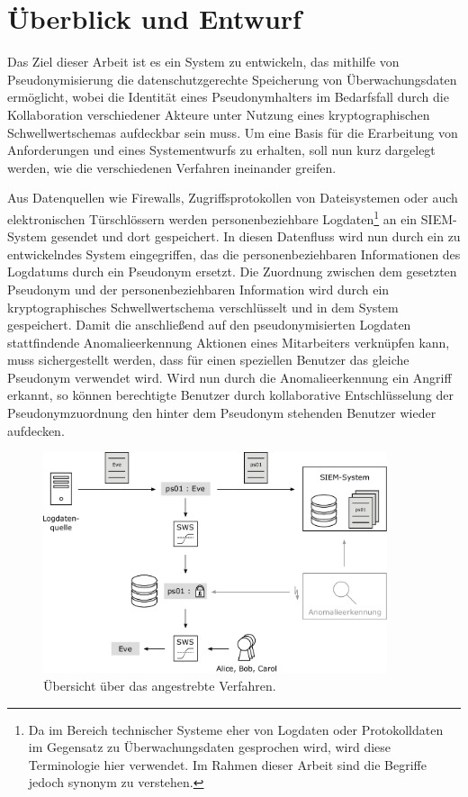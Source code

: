 \chapter{Überblick und Entwurf}
\label{cha_overview}

Das Ziel dieser Arbeit ist es ein System zu entwickeln, das mithilfe von Pseudonymisierung die datenschutzgerechte Speicherung von Überwachungsdaten ermöglicht, wobei die Identität eines Pseudonymhalters im Bedarfsfall durch die Kollaboration verschiedener Akteure unter Nutzung eines kryptographischen Schwellwertschemas aufdeckbar sein muss. Um eine Basis für die Erarbeitung von Anforderungen und eines Systementwurfs zu erhalten, soll nun kurz dargelegt werden, wie die verschiedenen Verfahren ineinander greifen. 

Aus Datenquellen wie Firewalls, Zugriffsprotokollen von Dateisystemen oder auch elektronischen Türschlössern werden personenbeziehbare Logdaten\footnote{
  Da im Bereich technischer Systeme eher von Logdaten oder Protokolldaten im Gegensatz zu Überwachungsdaten gesprochen wird, wird diese Terminologie hier verwendet. Im Rahmen dieser Arbeit sind die Begriffe jedoch synonym zu verstehen.
} an ein SIEM-System gesendet und dort gespeichert. In diesen Datenfluss wird nun durch ein zu entwickelndes System eingegriffen, das die personenbeziehbaren Informationen des Logdatums durch ein Pseudonym ersetzt. Die Zuordnung zwischen dem gesetzten Pseudonym und der personenbeziehbaren Information wird durch ein kryptographisches Schwellwertschema verschlüsselt und in dem System gespeichert. Damit die anschließend auf den pseudonymisierten Logdaten stattfindende Anomalieerkennung Aktionen eines Mitarbeiters verknüpfen kann, muss sichergestellt werden, dass für einen speziellen Benutzer das gleiche Pseudonym verwendet wird. Wird nun durch die Anomalieerkennung ein Angriff erkannt, so können berechtigte Benutzer durch kollaborative Entschlüsselung der Pseudonymzuordnung den hinter dem Pseudonym stehenden Benutzer wieder aufdecken.

\begin{figure}[]
    \centering
        \includegraphics[width=0.9\textwidth]{dia/overview.pdf}
    \caption{Übersicht über das angestrebte Verfahren.}
    \label{fig:overview_initial}
\end{figure}

